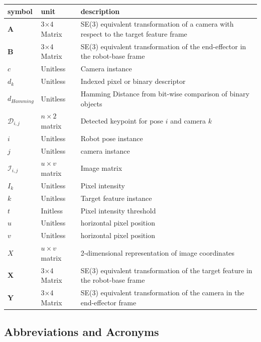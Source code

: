 \documentclass[12pt]{article}
\begin{document}
\renewcommand{\arraystretch}{1.2}
\noindent \begin{longtable*}{l l p{12cm}} \toprule
\textbf{symbol} & \textbf{unit} & \textbf{description}\\
\midrule 
$\textbf{A}$ & 3$\times$4 Matrix & SE(3) equivalent transformation of a camera 
with respect to the target feature frame
\\
$\textbf{B}$ & 3$\times$4 Matrix & SE(3) equivalent transformation of the 
end-effector in the robot-base frame
\\
$c$ &	Unitless & Camera instance
\\
$d_{k}$ & Unitless & Indexed pixel or binary descriptor 
\\
$d_{Hamming}$ & Unitless & Hamming Distance from bit-wise comparison of binary objects
\\
$\mathit{\mathcal{D}_{i, j}}$ & $n \times 2$ matrix & Detected keypoint for pose $i$
and camera $k$
\\
$i$ & Unitless & Robot pose instance
\\
$j$ & Unitless & camera instance
\\
$\mathit{\mathcal{I}_{i, j}}$ & $u \times v$ matrix & Image matrix
\\
$I_{k}$ & Unitless & Pixel intensity
\\
$k$ &	Unitless & Target feature instance
\\
$t$ & Initless & Pixel intensity threshold
\\
$u$ & Unitless & horizontal pixel position
\\
$v$ & Unitless & horizontal pixel position
\\
$\mathit{X}$ & $u \times v$ matrix & 2-dimensional representation of image coordinates 
\\
$\textbf{X}$ & 3$\times$4 Matrix & SE(3) equivalent transformation of the target 
feature in the robot-base frame
\\
$\textbf{Y}$ & 3$\times$4 Matrix & SE(3) equivalent transformation of the camera 
in the end-effector frame
\\ 
\bottomrule
\end{longtable*}

\subsection{Abbreviations and Acronyms}
\end{document}
